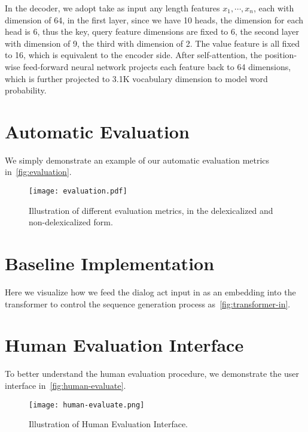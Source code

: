 \documentclass[11pt,a4paper]{article}
\begin{document}
In the decoder, we adopt take as input any length features $x_1, \cdots, x_n$, each with dimension of 64, in the first layer, since we have 10 heads, the dimension for each head is 6, thus the key, query feature dimensions are fixed to 6, the second layer with dimension of 9, the third with dimension of 2. The value feature is all fixed to 16, which is equivalent to the encoder side. After self-attention, the position-wise feed-forward neural network projects each feature back to 64 dimensions, which is further projected to 3.1K vocabulary dimension to model word probability.  

\section{Automatic Evaluation}
We simply demonstrate an example of our automatic evaluation metrics in~\autoref{fig:evaluation}.
\begin{figure*}[thb]
    \begin{center}
    \texttt{[image: evaluation.pdf]}
    \end{center}
    \caption{Illustration of different evaluation metrics, in the delexicalized and non-delexicalized form.}
    \label{fig:evaluation}
\end{figure*}
\label{sec:appendix}

\section{Baseline Implementation}
Here we visualize how we feed the dialog act input in as an embedding into the transformer to control the sequence generation process as~\autoref{fig:transformer-in}.

\section{Human Evaluation Interface}
To better understand the human evaluation procedure, we demonstrate the user interface in~\autoref{fig:human-evaluate}.
\begin{figure*}[thb]
    \begin{center}
    \texttt{[image: human-evaluate.png]}
    \end{center}
    \caption{Illustration of Human Evaluation Interface. }
    \label{fig:human-evaluate}
\end{figure*}
\end{document}

